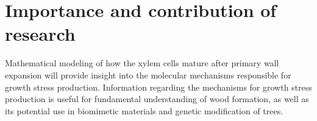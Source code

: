 \section{Importance and contribution of research}
Mathematical modeling of how the xylem cells mature after primary
wall expansion will provide insight into the molecular mechanisms
responsible for growth stress production. Information regarding the mechanisms
for growth stress production is useful for fundamental understanding of
wood formation, as well as its potential use in biomimetic materials and
genetic modification of trees.